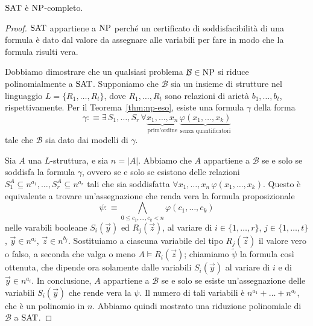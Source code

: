 \begin{teorema}
  $\operatorname{SAT}$ è $\operatorname{NP}$-completo.
\end{teorema}

\begin{proof}
  $\operatorname{SAT}$ appartiene a $\operatorname{NP}$ perché un certificato di soddisfacibilità di una formula è dato dal valore da assegnare alle variabili per fare in modo che la formula risulti vera.
  
  Dobbiamo dimostrare che un qualsiasi problema $\mathcal{B}\in\operatorname{NP}$ si riduce polinomialmente a $\operatorname{SAT}$.
  Supponiamo che $\mathcal{B}$ sia un insieme di strutture nel linguaggio $L=\{R_1,\dots,R_t\}$, dove $R_1,\dots,R_t$ sono relazioni di arietà $b_1,\dots,b_t$, rispettivamente.
  Per il Teorema~\ref{thm:np-eso}, esiste una formula $\gamma$ della forma
  \[ \gamma :\equiv \exists\, S_1,\dots,S_r \, \forall \underbrace{x_1,\dots,x_n}_{\text{prim'ordine}} \, \underbrace{\varphi(x_1,\dots,x_k)}_{\text{senza quantificatori}} \]
  tale che $\mathcal{B}$ sia dato dai modelli di $\gamma$.
  
  Sia $A$ una $L$-struttura, e sia $n=|A|$. Abbiamo che $A$ appartiene a $\mathcal{B}$ se e solo se soddisfa la formula $\gamma$, ovvero se e solo se esistono delle relazioni $S_1^A\subseteq n^{a_1}, \dots, S_r^A\subseteq n^{a_r}$ tali che sia soddisfatta $\forall x_1,\dots,x_n \,\varphi(x_1,\dots,x_k)$.
  Questo è equivalente a trovare un'assegnazione che renda vera la formula proposizionale
  \[ \psi :\equiv \bigwedge_{0\leq c_1,\dots,c_k < n} \varphi(c_1,\dots,c_k) \]
  nelle varabili booleane $S_i(\vec{y})$ ed $R_j(\vec{z})$, al variare di $i\in \{1,\ldots,r\}$, $j\in\{1,\dots,t\}$, $\vec{y}\in n^{a_i}$, $\vec{z}\in n^{b_j}$.
  Sostituiamo a ciascuna variabile del tipo $R_j(\vec{z})$ il valore vero o falso, a seconda che valga o meno $A \models R_i(\vec{z})$; chiamiamo $\tilde\psi$ la formula così ottenuta, che dipende ora solamente dalle variabili $S_i(\vec{y})$ al variare di $i$ e di $\vec{y}\in n^{a_i}$.
  In conclusione, $A$ appartiene a $\mathcal{B}$ se e solo se esiste un'assegnazione delle variabili $S_i(\vec{y})$ che rende vera la $\psi$. Il numero di tali variabili è $n^{a_1}+\ldots+n^{a_r}$, che è un polinomio in $n$.
  Abbiamo quindi mostrato una riduzione polinomiale di $\mathcal{B}$ a $\operatorname{SAT}$.
\end{proof}
